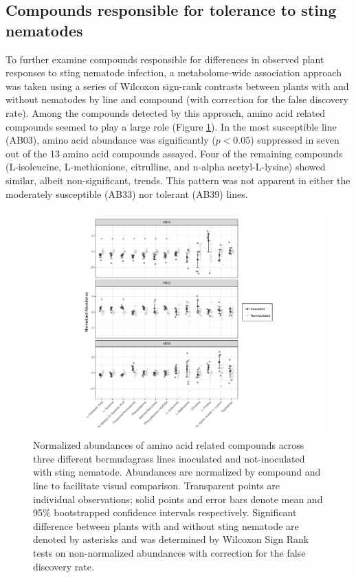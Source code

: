 \documentclass[fleqn,10pt]{wlscirep}
\begin{document}
\subsection*{Compounds responsible for tolerance to sting nematodes}
To further examine compounds responsible for differences in observed plant responses to sting nematode infection, a metabolome-wide association approach was taken using a series of Wilcoxon sign-rank contrasts between plants with and without nematodes by line and compound (with correction for the false discovery rate).  Among the compounds detected by this approach, amino acid related compounds seemed to play a large role (Figure \ref{fig:figure4}).  In the most susceptible line (AB03), amino acid abundance was significantly ($p < 0.05$) suppressed in seven out of the 13 amino acid compounds assayed.  Four of the remaining compounds (L-isoleucine, L-methionione, citrulline, and n-alpha acetyl-L-lysine) showed similar, albeit non-significant, trends.  This pattern was not apparent in either the moderately susceptible (AB33) nor tolerant (AB39) lines.  

\begin{figure}
\includegraphics[width = 0.95\linewidth]{figures/publication_figures/figure-4.pdf}
\caption{Normalized abundances of amino acid related compounds across three different bermudagrass lines inoculated and not-inoculated with sting nematode.  Abundances are normalized by compound and line to facilitate visual comparison.  Transparent points are individual observations; solid points and error bars denote mean and 95\% bootstrapped confidence intervals respectively.  Significant difference between plants with and without sting nematode are denoted by asterisks and was determined by Wilcoxon Sign Rank tests on non-normalized abundances with correction for the false discovery rate.  }
\label{fig:figure4}
\end{figure}
\end{document}
